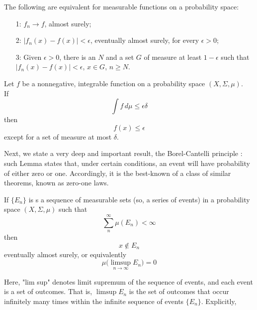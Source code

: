 \begin{lemma}
    The following are equivalent for measurable functions on a probability space:
    \begin{itemize}
        \item[1:] $f_n \rightarrow f$, almost surely;
        \item[2:] $|f_n(x) - f(x)| < \epsilon$, eventually almost surely, for every $\epsilon>0$;
        \item[3:] Given $\epsilon>0$, there is an $N$ and a set $G$ of measure at least $1 - \epsilon$ such that $|f_n(x) - f(x)| < \epsilon$, $x \in G$, $n \geq N$.
    \end{itemize}
\end{lemma}
\begin{lemma}
\label{lemma:markov_ineq}
    Let $f$ be a nonnegative, integrable function on a probability space $(X, \Sigma, \mu)$. 
    \\If 
    \begin{equation*}
        \int f \, d \mu \leq \epsilon \delta
    \end{equation*}
    then 
    \begin{equation*}
        f(x) \leq \epsilon
    \end{equation*}
    except for a set of measure at most $\delta$. 
\end{lemma}
Next, we state a very deep and important result, the Borel-Cantelli principle \cite{Borel_cantelli}: such Lemma states that, under certain conditions, an event will have probability of either zero or one. Accordingly, it is the best-known of a class of similar theorems, known as zero-one laws.
\begin{lemma}
    If $\{E_n \}$ is s a sequence of measurable sets (so, a series of events) in a probability space $(X, \Sigma, \mu)$ such that
    \begin{equation*}
        \sum_n^{\infty} \mu(E_n) < \infty
    \end{equation*}
    then 
    \begin{equation*}
        x \notin E_n 
    \end{equation*}
    eventually almost surely, or equivalently 
    \begin{equation*}
        \mu \big( \limsup_{n \rightarrow \infty} E_n \big) = 0
    \end{equation*}
\end{lemma}
Here, "lim sup" denotes limit supremum of the sequence of events, and each event is a set of outcomes. That is, $\limsup E_n$ is the set of outcomes that occur infinitely many times within the infinite sequence of events $\{ E_n \}$. Explicitly,
